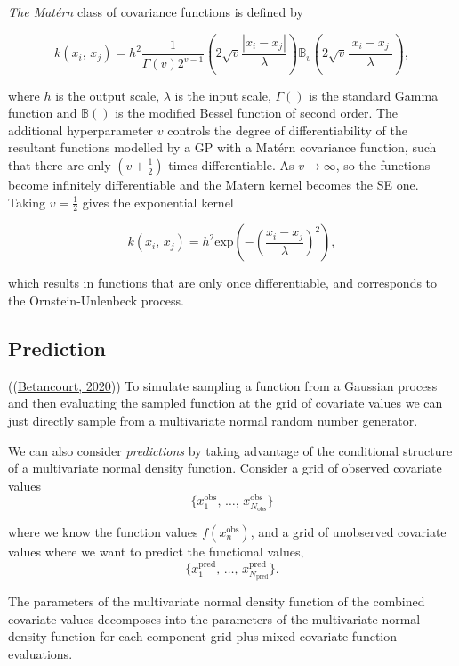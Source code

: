 \documentclass[a4paper, 10pt, fleqn]{article}
\begin{document}
\begin{flushleft}
   \vspace{1em}

   \textit{The Mat\'ern} class of covariance functions is defined by

   $$k(x_{i}, \, x_{j}) = h^{2} \frac{1}{\Gamma(v)2^{v-1}} (2\sqrt{v}\frac{|x_{i} - x_{j}|}{\lambda}) \mathbb{B}_{v} (2\sqrt{v}\frac{|x_{i} - x_{j}|}{\lambda}),$$

   where $h$ is the output scale, $\lambda$ is the input scale, $\Gamma()$ is the standard Gamma function and $\mathbb{B}()$ is the modified Bessel function of second order. The additional hyperparameter $v$ controls the degree of differentiability of the resultant functions modelled by a GP with a Mat\'ern covariance function, such that there are only $(v + \frac{1}{2})$ times differentiable. As $v \to \infty$, so the functions become infinitely differentiable and the Matern kernel becomes the SE one. Taking $v = \frac{1}{2}$ gives the exponential kernel

   $$k(x_{i}, \, x_{j}) = h^{2} \text{exp}(-(\frac{x_i - x_j}{\lambda})^2),$$

   which results in functions that are only once differentiable, and corresponds to the Ornstein-Unlenbeck process.

   \subsection*{Prediction}

   ((\hyperref[Betancourt2020]{Betancourt, 2020})) To simulate sampling a function from a Gaussian process and then evaluating the sampled function at the grid of covariate values we can just directly sample from a multivariate normal random number generator.

   \vspace{1em}

   We can also consider \textit{predictions} by taking advantage of the conditional structure of a multivariate normal density function. Consider a grid of observed covariate values $$\{x_{1}^{\text{obs}}, \, \ldots, \, x_{N_{\text{obs}}}^{\text{obs}}\}$$

   where we know the function values $f(x_{n}^{\text{obs}})$, and a grid of unobserved covariate values where we want to predict the functional values, $$\{x_{1}^{\text{pred}}, \, \ldots, \, x_{N_{\text{pred}}}^{\text{pred}}\}.$$

   The parameters of the multivariate normal density function of the combined covariate values decomposes into the parameters of the multivariate normal density function for each component grid plus mixed covariate function evaluations.


\end{flushleft}
\end{document}

